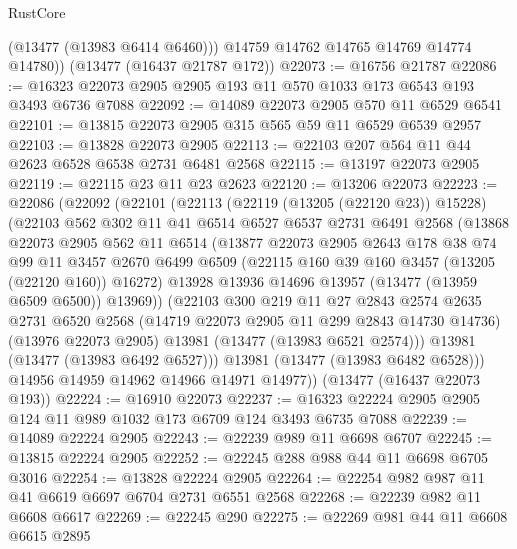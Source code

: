 \begin{lexlean}{RustCore}
\begin{coremodule}
          (@13477 (@13983 @6414 @6460)))
        @14759
        @14762
        @14765
        @14769
        @14774
        @14780))
    (@13477 (@16437 @21787 @172))
@22073 := @16756 @21787
@22086 := @16323 @22073 @2905 @2905 @193 @11 @570 @1033 @173 @6543 @193 @3493 @6736 @7088
@22092 := @14089 @22073 @2905 @570 @11 @6529 @6541
@22101 := @13815 @22073 @2905 @315 @565 @59 @11 @6529 @6539 @2957
@22103 := @13828 @22073 @2905
@22113 := @22103 @207 @564 @11 @44 @2623 @6528 @6538 @2731 @6481 @2568
@22115 := @13197 @22073 @2905
@22119 := @22115 @23 @11 @23 @2623
@22120 := @13206 @22073
@22223 := @22086
    (@22092
      (@22101
        (@22113
          (@22119 (@13205 (@22120 @23)) @15228)
          (@22103
            @562
            @302
            @11
            @41
            @6514
            @6527
            @6537
            @2731
            @6491
            @2568
            (@13868
              @22073
              @2905
              @562
              @11
              @6514
              (@13877
                @22073
                @2905
                @2643
                @178
                @38
                @74
                @99
                @11
                @3457
                @2670
                @6499
                @6509
                (@22115 @160 @39 @160 @3457 (@13205 (@22120 @160)) @16272)
                @13928
                @13936
                @14696
                @13957
                (@13477 (@13959 @6509 @6500))
                @13969))
            (@22103
              @300
              @219
              @11
              @27
              @2843
              @2574
              @2635
              @2731
              @6520
              @2568
              (@14719 @22073 @2905 @11 @299 @2843 @14730 @14736)
              (@13976 @22073 @2905)
              @13981
              (@13477 (@13983 @6521 @2574)))
            @13981
            (@13477 (@13983 @6492 @6527)))
          @13981
          (@13477 (@13983 @6482 @6528)))
        @14956
        @14959
        @14962
        @14966
        @14971
        @14977))
    (@13477 (@16437 @22073 @193))
@22224 := @16910 @22073
@22237 := @16323 @22224 @2905 @2905 @124 @11 @989 @1032 @173 @6709 @124 @3493 @6735 @7088
@22239 := @14089 @22224 @2905
@22243 := @22239 @989 @11 @6698 @6707
@22245 := @13815 @22224 @2905
@22252 := @22245 @288 @988 @44 @11 @6698 @6705 @3016
@22254 := @13828 @22224 @2905
@22264 := @22254 @982 @987 @11 @41 @6619 @6697 @6704 @2731 @6551 @2568
@22268 := @22239 @982 @11 @6608 @6617
@22269 := @22245 @290
@22275 := @22269 @981 @44 @11 @6608 @6615 @2895

\end{coremodule}
\end{lexlean}
